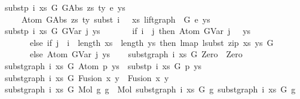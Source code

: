 \begin{isabellebody}
{\isacharbar}{\kern0pt}\ {\isachardoublequoteopen}subst{\isacharunderscore}{\kern0pt}p\ i\ xs\ G\ {\isacharparenleft}{\kern0pt}GAbs\ zs\ ty\ e{}{\isacharparenright}{\kern0pt}\ ys\ {\isacharequal}{\kern0pt}\isanewline
\ \ \ \ \ Atom\ {\isacharparenleft}{\kern0pt}GAbs\ zs\ ty\ {\isacharparenleft}{\kern0pt}subst\ {\isacharparenleft}{\kern0pt}i\ {\isacharplus}{\kern0pt}\ {}{\isacharparenright}{\kern0pt}\ xs\ {\isacharparenleft}{\kern0pt}lift{\isacharunderscore}{\kern0pt}graph\ {}\ G{\isacharparenright}{\kern0pt}\ e{}{\isacharparenright}{\kern0pt}{\isacharparenright}{\kern0pt}\ ys{\isachardoublequoteclose}\isanewline
{\isacharbar}{\kern0pt}\ {\isachardoublequoteopen}subst{\isacharunderscore}{\kern0pt}p\ i\ xs\ G\ {\isacharparenleft}{\kern0pt}GVar\ j{\isacharparenright}{\kern0pt}\ ys\ {\isacharequal}{\kern0pt}\isanewline
\ \ \ \ \ \ {\isacharparenleft}{\kern0pt}if\ i\ {\isacharless}{\kern0pt}\ j\ then\ {\isacharparenleft}{\kern0pt}Atom\ {\isacharparenleft}{\kern0pt}GVar\ {\isacharparenleft}{\kern0pt}j\ {\isacharminus}{\kern0pt}\ {}{\isacharparenright}{\kern0pt}{\isacharparenright}{\kern0pt}\ ys{\isacharparenright}{\kern0pt}\isanewline
\ \ \ \ \ \ \ else\ if\ j\ {\isacharequal}{\kern0pt}\ i\ {\isasymand}\ length\ xs\ {\isacharequal}{\kern0pt}\ length\ ys\ then\ lmap\ {\isacharparenleft}{\kern0pt}lsubst\ {\isacharparenleft}{\kern0pt}zip\ xs\ ys{\isacharparenright}{\kern0pt}{\isacharparenright}{\kern0pt}\ G\isanewline
\ \ \ \ \ \ \ else\ {\isacharparenleft}{\kern0pt}Atom\ {\isacharparenleft}{\kern0pt}GVar\ j{\isacharparenright}{\kern0pt}\ ys{\isacharparenright}{\kern0pt}{\isacharparenright}{\kern0pt}{\isachardoublequoteclose}\isanewline
\isanewline
\ \ \isanewline
{\isacharbar}{\kern0pt}\ {\isachardoublequoteopen}subst{\isacharunderscore}{\kern0pt}graph\ i\ xs\ G\ Zero\ {\isacharequal}{\kern0pt}\ Zero{\isachardoublequoteclose}\isanewline
{\isacharbar}{\kern0pt}\ {\isachardoublequoteopen}subst{\isacharunderscore}{\kern0pt}graph\ i\ xs\ G\ {\isacharparenleft}{\kern0pt}Atom\ p\ ys{\isacharparenright}{\kern0pt}\ {\isacharequal}{\kern0pt}\ subst{\isacharunderscore}{\kern0pt}p\ i\ xs\ G\ p\ ys\ {\isachardoublequoteclose}\isanewline
{\isacharbar}{\kern0pt}\ {\isachardoublequoteopen}subst{\isacharunderscore}{\kern0pt}graph\ i\ xs\ G\ {\isacharparenleft}{\kern0pt}Fusion\ x\ y{\isacharparenright}{\kern0pt}\ {\isacharequal}{\kern0pt}\ Fusion\ x\ y{\isachardoublequoteclose}\isanewline
{\isacharbar}{\kern0pt}\ {\isachardoublequoteopen}subst{\isacharunderscore}{\kern0pt}graph\ i\ xs\ G\ {\isacharparenleft}{\kern0pt}Mol\ g{}\ g{}{\isacharparenright}{\kern0pt}\ {\isacharequal}{\kern0pt}\ Mol\ {\isacharparenleft}{\kern0pt}subst{\isacharunderscore}{\kern0pt}graph\ i\ xs\ G\ g{}{\isacharparenright}{\kern0pt}\ {\isacharparenleft}{\kern0pt}subst{\isacharunderscore}{\kern0pt}graph\ i\ xs\ G\ g{}{\isacharparenright}{\kern0pt}{\isachardoublequoteclose}\isanewline

\end{isabellebody}
